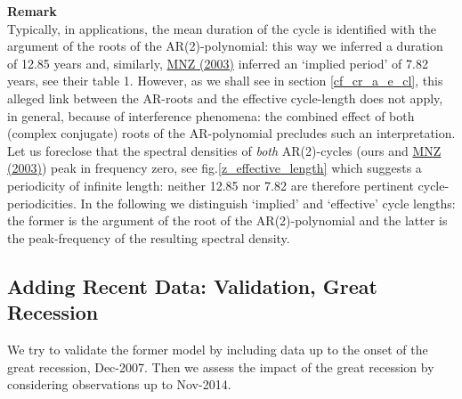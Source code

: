 \documentclass[a4paper]{book}
\begin{document}
\textbf{Remark}\\
Typically, in applications, the mean duration of the cycle is identified with the argument of the roots of the AR(2)-polynomial: this way we inferred a duration of 12.85 years and, similarly, \href{https://www.dropbox.com/s/1qn5h7s02c86j8i/mnz03.pdf?dl=0}{MNZ (2003)} inferred an `implied period' of 7.82 years, see their table 1. However, as we shall see in section \ref{cf_cr_a_e_cl}, this alleged link between the AR-roots and the effective cycle-length does not apply, in general, because of interference phenomena: the combined effect of both (complex conjugate) roots of the AR-polynomial precludes such an interpretation. Let us foreclose that the spectral densities of \emph{both} AR(2)-cycles (ours and \href{https://www.dropbox.com/s/1qn5h7s02c86j8i/mnz03.pdf?dl=0}{MNZ (2003)}) peak in frequency zero, see fig.\ref{z_effective_length} which suggests a periodicity of infinite length: neither 12.85 nor 7.82 are therefore pertinent cycle-periodicities. In the following we distinguish `implied' and `effective' cycle lengths: the former is the argument of the root of the AR(2)-polynomial and the latter is the peak-frequency of the resulting spectral density. 





\subsection{Adding Recent Data: Validation, Great Recession}

We try to validate the former model by including data up to the onset of the great recession, Dec-2007. Then we assess the impact of the great recession by considering observations up to Nov-2014.
\end{document}
